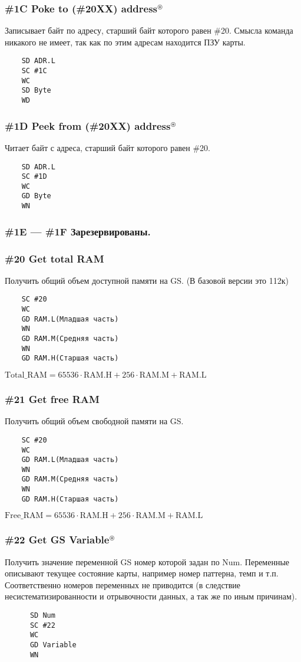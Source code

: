 \documentclass[a4paper,11pt]{article}
\DeclareRobustCommand{\Cyrax}{\texorpdfstring{\(^\circledast\)}{\circledast}}
\begin{document}
\subsubsection{\#1C Poke to (\#20XX) address\Cyrax}
Записывает байт по адресу, старший байт которого равен \#20. Смысла команда никакого не имеет, так как по этим адресам находится ПЗУ карты. 
\begin{verbatim}
    SD ADR.L
    SC #1C
    WC
    SD Byte
    WD
\end{verbatim}

\subsubsection{\#1D Peek from (\#20XX) address\Cyrax}
Читает байт с адреса, старший байт которого равен \#20.
\begin{verbatim}
    SD ADR.L
    SC #1D
    WC
    GD Byte
    WN
\end{verbatim}

\subsubsection{\#1E --- \#1F Зарезервированы.}

\subsubsection{\#20 Get total RAM}
Получить общий объем доступной памяти на GS. (В базовой версии это 112к)
\begin{verbatim}
    SC #20
    WC
    GD RAM.L(Младшая часть)
    WN
    GD RAM.M(Средняя часть)
    WN
    GD RAM.H(Старшая часть)
\end{verbatim}

\(\mathrm{Total\_RAM}=65536\cdotp\mathrm{RAM.H}+256\cdotp\mathrm{RAM.M}+\mathrm{RAM.L}\)

\subsubsection{\#21 Get free RAM}
Получить общий объем свободной памяти на GS.
\begin{verbatim}
    SC #20
    WC
    GD RAM.L(Младшая часть)
    WN
    GD RAM.M(Средняя часть)
    WN
    GD RAM.H(Старшая часть)
\end{verbatim}

\(\mathrm{Free\_RAM}=65536\cdotp\mathrm{RAM.H}+256\cdotp\mathrm{RAM.M}+\mathrm{RAM.L}\)

\subsubsection{\#22 Get GS Variable\Cyrax}
Получить значение переменной GS номер которой задан по Num. Переменные описывают текущее состояние карты, например номер паттерна, темп и т.п. Соответственно номеров переменных не приводится (в следствие несистематизированности и отрывочности данных, а так же по иным причинам).
\begin{verbatim}
      SD Num
      SC #22
      WC
      GD Variable
      WN
\end{verbatim}
\end{document}
